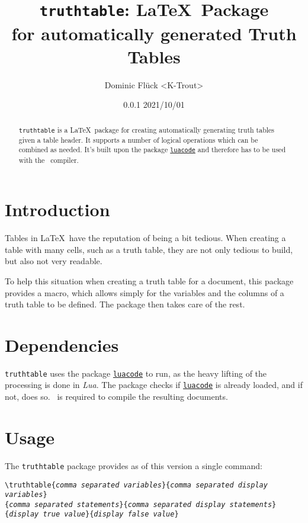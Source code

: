 \documentclass[a4paper]{article}
\title{\texttt{truthtable}\textbf{: \LaTeX\ Package\\for automatically generated Truth Tables}}
\author{Dominic Flück <K-Trout>}
\date{0.0.1 2021/10/01}
\begin{document}
\maketitle

\begin{abstract}
	\noindent \texttt{truthtable} is a \LaTeX\ package for creating automatically generating truth tables given a table header. It supports a number of logical operations which can be combined as needed. It's built upon the package \href{https://ctan.org/pkg/luacode}{\texttt{luacode}} and therefore has to be used with the \LuaLaTeX\ compiler.
\end{abstract}

\tableofcontents

\section{Introduction}
Tables in \LaTeX\ have the reputation of being a bit tedious. When creating a table with many cells, such as a truth table, they are not only tedious to build, but also not very readable.

To help this situation when creating a truth table for a document, this package provides a macro, which allows simply for the variables and the columns of a truth table to be defined. The package then takes care of the rest.

\section{Dependencies}

\texttt{truthtable} uses the package \href{https://ctan.org/pkg/luacode}{\texttt{luacode}} to run, as the heavy lifting of the processing is done in \emph{Lua}. 	The package checks if \href{https://ctan.org/pkg/luacode}{\texttt{luacode}} is already loaded, and if not, does so. \LuaLaTeX\ is required to compile the resulting documents.

\section{Usage}

The \texttt{truthtable} package provides as of this version a single command:

\noindent\texttt{\textbackslash truthtable\{\emph{comma separated variables}\}\{\emph{comma separated display variables}\}\\\{\emph{comma separated statements}\}\{\emph{comma separated display statements}\}\\\{\emph{display true value}\}\{\emph{display false value}\}}
\end{document}
